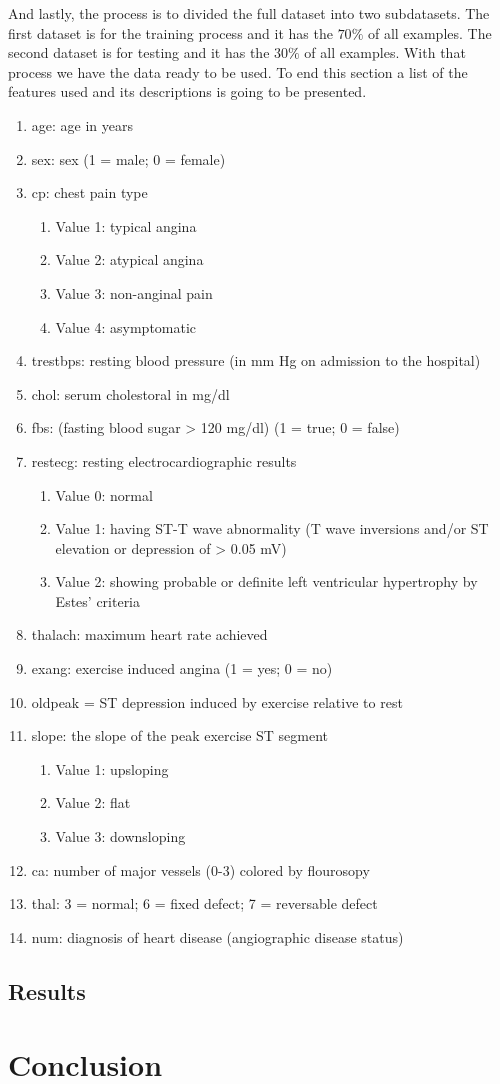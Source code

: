 \documentclass[12pt]{article}
\begin{document}
And lastly, the process is to divided the full dataset into two subdatasets. The first dataset is for the training process and it has the $70\%$ of all examples. The second dataset is for testing and it has the $30\%$ of all examples.
With that process we have the data ready to be used. To end this section a list of the features used and its descriptions is going to be presented.
\begin{enumerate} 
	\item age: age in years 
	\item sex: sex (1 = male; 0 = female)
	\item cp: chest pain type 
	\begin{enumerate} 
		\item Value 1: typical angina 
		\item Value 2: atypical angina 
		\item Value 3: non-anginal pain 
		\item Value 4: asymptomatic 
	\end{enumerate}
	\item trestbps: resting blood pressure (in mm Hg on admission to the hospital) 
	\item chol: serum cholestoral in mg/dl 
	\item fbs: (fasting blood sugar > 120 mg/dl) (1 = true; 0 = false) 
	\item restecg: resting electrocardiographic results 
	\begin{enumerate} 
		\item Value 0: normal 
		\item Value 1: having ST-T wave abnormality (T wave inversions and/or ST elevation or depression of > 0.05 mV)  
		\item Value 2: showing probable or definite left ventricular hypertrophy by Estes' criteria 
	\end{enumerate}
	\item thalach: maximum heart rate achieved 
	\item exang: exercise induced angina (1 = yes; 0 = no)
	\item oldpeak = ST depression induced by exercise relative to rest 
	\item slope: the slope of the peak exercise ST segment 
	\begin{enumerate} 
		\item Value 1: upsloping 
		\item Value 2: flat   
		\item Value 3: downsloping 
	\end{enumerate}
	\item ca: number of major vessels (0-3) colored by flourosopy
	\item thal: 3 = normal; 6 = fixed defect; 7 = reversable defect
	\item num: diagnosis of heart disease (angiographic disease status)
\end{enumerate}
\subsection{Results}

\section{Conclusion}



\end{document}

